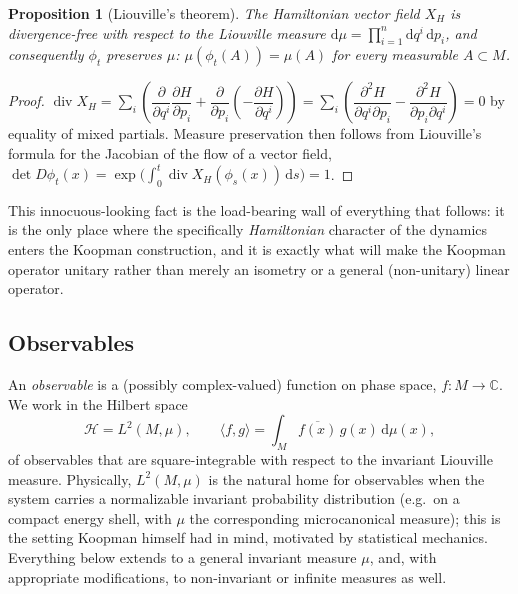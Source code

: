 \documentclass[11pt]{article}
\newtheorem{proposition}{Proposition}[section]
\theoremstyle{remark}
\newcommand{\dd}{\mathrm{d}}
\newcommand{\C}{\mathbb{C}}
\begin{document}
\begin{proposition}[Liouville's theorem]
\label{prop:liouville}
The Hamiltonian vector field $X_H$ is divergence-free with respect to the Liouville measure $\dd\mu = \prod_{i=1}^n \dd q^i\,\dd p_i$, and consequently $\phi_t$ preserves $\mu$: $\mu(\phi_t(A))=\mu(A)$ for every measurable $A\subset M$.
\end{proposition}
\begin{proof}
$\operatorname{div}X_H = \sum_i\left(\dfrac{\partial}{\partial q^i}\dfrac{\partial H}{\partial p_i}+\dfrac{\partial}{\partial p_i}\left(-\dfrac{\partial H}{\partial q^i}\right)\right)=\sum_i\left(\dfrac{\partial^2 H}{\partial q^i\partial p_i}-\dfrac{\partial^2 H}{\partial p_i\partial q^i}\right)=0$ by equality of mixed partials. Measure preservation then follows from Liouville's formula for the Jacobian of the flow of a vector field, $\det D\phi_t(x) = \exp\!\big(\int_0^t \operatorname{div}X_H(\phi_s(x))\,\dd s\big)=1$.
\end{proof}

This innocuous-looking fact is the load-bearing wall of everything that follows: it is the only place where the specifically \emph{Hamiltonian} character of the dynamics enters the Koopman construction, and it is exactly what will make the Koopman operator unitary rather than merely an isometry or a general (non-unitary) linear operator.

\subsection{Observables}

An \emph{observable} is a (possibly complex-valued) function on phase space, $f:M\to\C$. We work in the Hilbert space
\begin{equation}
\mathcal H = L^2(M,\mu), \qquad \langle f,g\rangle = \int_M \overline{f(x)}\,g(x)\,\dd\mu(x),
\end{equation}
of observables that are square-integrable with respect to the invariant Liouville measure. Physically, $L^2(M,\mu)$ is the natural home for observables when the system carries a normalizable invariant probability distribution (e.g.\ on a compact energy shell, with $\mu$ the corresponding microcanonical measure); this is the setting Koopman himself had in mind, motivated by statistical mechanics. Everything below extends to a general invariant measure $\mu$, and, with appropriate modifications, to non-invariant or infinite measures as well.

\end{document}
